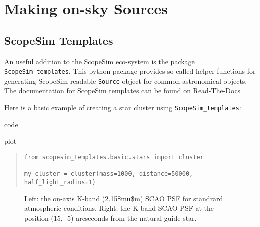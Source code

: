 

\section{Making on-sky Sources%
  \label{making-on-sky-sources}%
}


\subsection{ScopeSim Templates%
  \label{scopesim-templates}%
}

An useful addition to the ScopeSim eco-system is the package \texttt{ScopeSim\_templates}.
This python package provides so-called helper functions for generating ScopeSim readable \texttt{Source} object for common astronomical objects.
The documentation for \href{https://scopesim-templates.readthedocs.io/en/latest/}{ScopeSim templates can be found on Read-The-Docs}

Here is a basic example of creating a star cluster using \texttt{ScopeSim\_templates}:

\label{code-scopesim-templates-example}
\begin{DUclass}{code}
\begin{DUclass}{plot}
\begin{quote}
\begin{alltt}
\begin{lstlisting}[frame=single]
from scopesim_templates.basic.stars import cluster

my_cluster = cluster(mass=1000, distance=50000, half_light_radius=1)
\end{lstlisting}
\end{alltt}
\end{quote}
\end{DUclass}
\end{DUclass}


\begin{figure}[H]
\noindent{}\label{fig-scopesim-templates-cluster-example}

\caption{Left: the on-axis K-band (2.15\$mu\$m) SCAO PSF for standrard atmospheric conditions.
Right: the K-band SCAO-PSF at the position (15, -5) arcseconds from the natural guide star.}
\end{figure}

